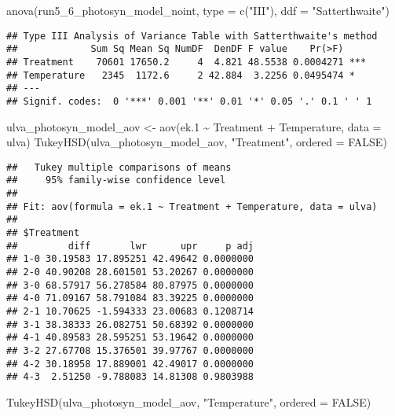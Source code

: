 \documentclass[
]{article}
\newenvironment{Shaded}{\begin{snugshade}}{\end{snugshade}}
\newcommand{\AttributeTok}[1]{\textcolor[rgb]{0.77,0.63,0.00}{#1}}
\newcommand{\ConstantTok}[1]{\textcolor[rgb]{0.00,0.00,0.00}{#1}}
\newcommand{\FloatTok}[1]{\textcolor[rgb]{0.00,0.00,0.81}{#1}}
\newcommand{\FunctionTok}[1]{\textcolor[rgb]{0.00,0.00,0.00}{#1}}
\newcommand{\NormalTok}[1]{#1}
\newcommand{\OtherTok}[1]{\textcolor[rgb]{0.56,0.35,0.01}{#1}}
\newcommand{\SpecialCharTok}[1]{\textcolor[rgb]{0.00,0.00,0.00}{#1}}
\newcommand{\StringTok}[1]{\textcolor[rgb]{0.31,0.60,0.02}{#1}}
\begin{document}
\begin{Shaded}
\begin{Highlighting}[]
\FunctionTok{anova}\NormalTok{(run5\_6\_photosyn\_model\_noint, }\AttributeTok{type =} \FunctionTok{c}\NormalTok{(}\StringTok{"III"}\NormalTok{), }\AttributeTok{ddf =} \StringTok{"Satterthwaite"}\NormalTok{)}
\end{Highlighting}
\end{Shaded}

\begin{verbatim}
## Type III Analysis of Variance Table with Satterthwaite's method
##             Sum Sq Mean Sq NumDF  DenDF F value    Pr(>F)    
## Treatment    70601 17650.2     4  4.821 48.5538 0.0004271 ***
## Temperature   2345  1172.6     2 42.884  3.2256 0.0495474 *  
## ---
## Signif. codes:  0 '***' 0.001 '**' 0.01 '*' 0.05 '.' 0.1 ' ' 1
\end{verbatim}

\begin{Shaded}
\begin{Highlighting}[]
\NormalTok{ulva\_photosyn\_model\_aov }\OtherTok{\textless{}{-}} \FunctionTok{aov}\NormalTok{(ek}\FloatTok{.1} \SpecialCharTok{\textasciitilde{}}\NormalTok{ Treatment }\SpecialCharTok{+}\NormalTok{ Temperature, }\AttributeTok{data =}\NormalTok{ ulva)}
\FunctionTok{TukeyHSD}\NormalTok{(ulva\_photosyn\_model\_aov, }\StringTok{"Treatment"}\NormalTok{, }\AttributeTok{ordered =} \ConstantTok{FALSE}\NormalTok{)}
\end{Highlighting}
\end{Shaded}

\begin{verbatim}
##   Tukey multiple comparisons of means
##     95% family-wise confidence level
## 
## Fit: aov(formula = ek.1 ~ Treatment + Temperature, data = ulva)
## 
## $Treatment
##         diff       lwr      upr     p adj
## 1-0 30.19583 17.895251 42.49642 0.0000000
## 2-0 40.90208 28.601501 53.20267 0.0000000
## 3-0 68.57917 56.278584 80.87975 0.0000000
## 4-0 71.09167 58.791084 83.39225 0.0000000
## 2-1 10.70625 -1.594333 23.00683 0.1208714
## 3-1 38.38333 26.082751 50.68392 0.0000000
## 4-1 40.89583 28.595251 53.19642 0.0000000
## 3-2 27.67708 15.376501 39.97767 0.0000000
## 4-2 30.18958 17.889001 42.49017 0.0000000
## 4-3  2.51250 -9.788083 14.81308 0.9803988
\end{verbatim}

\begin{Shaded}
\begin{Highlighting}[]
\FunctionTok{TukeyHSD}\NormalTok{(ulva\_photosyn\_model\_aov, }\StringTok{"Temperature"}\NormalTok{, }\AttributeTok{ordered =} \ConstantTok{FALSE}\NormalTok{)}
\end{Highlighting}
\end{Shaded}
\end{document}

